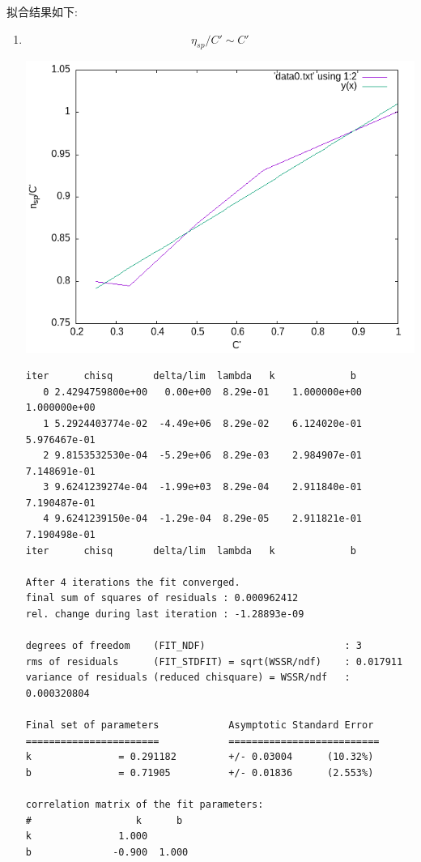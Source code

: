 \documentclass[11pt]{report}
\begin{document}
拟合结果如下:
\begin{enumerate}
\item 
\label{sec:orgd790981}
\[
\eta_{sp}/C' \sim C'
\]
\begin{center}
\includegraphics[width=.9\linewidth]{../data/out0.png}
\end{center}
\begin{verbatim}
iter      chisq       delta/lim  lambda   k             b            
   0 2.4294759800e+00   0.00e+00  8.29e-01    1.000000e+00   1.000000e+00
   1 5.2924403774e-02  -4.49e+06  8.29e-02    6.124020e-01   5.976467e-01
   2 9.8153532530e-04  -5.29e+06  8.29e-03    2.984907e-01   7.148691e-01
   3 9.6241239274e-04  -1.99e+03  8.29e-04    2.911840e-01   7.190487e-01
   4 9.6241239150e-04  -1.29e-04  8.29e-05    2.911821e-01   7.190498e-01
iter      chisq       delta/lim  lambda   k             b            

After 4 iterations the fit converged.
final sum of squares of residuals : 0.000962412
rel. change during last iteration : -1.28893e-09

degrees of freedom    (FIT_NDF)                        : 3
rms of residuals      (FIT_STDFIT) = sqrt(WSSR/ndf)    : 0.017911
variance of residuals (reduced chisquare) = WSSR/ndf   : 0.000320804

Final set of parameters            Asymptotic Standard Error
=======================            ==========================
k               = 0.291182         +/- 0.03004      (10.32%)
b               = 0.71905          +/- 0.01836      (2.553%)

correlation matrix of the fit parameters:
#                  k      b      
k               1.000 
b              -0.900  1.000 


\end{verbatim}
\end{enumerate}
\end{document}
